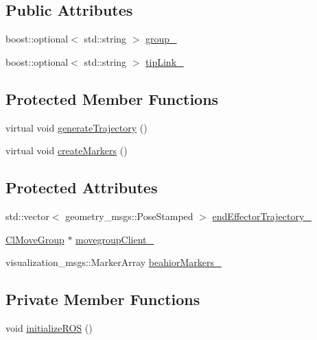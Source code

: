 \subsection*{Public Attributes}
\begin{DoxyCompactItemize}
\item 
boost\+::optional$<$ std\+::string $>$ \hyperlink{classcl__move__group__interface_1_1CbMoveEndEffectorTrajectory_aa247cf74c1d4878bacecba836a839fa7}{group\+\_\+}
\item 
boost\+::optional$<$ std\+::string $>$ \hyperlink{classcl__move__group__interface_1_1CbMoveEndEffectorTrajectory_a24c6c30b9b0761a61fa002d947bd3e11}{tip\+Link\+\_\+}
\end{DoxyCompactItemize}
\subsection*{Protected Member Functions}
\begin{DoxyCompactItemize}
\item 
virtual void \hyperlink{classcl__move__group__interface_1_1CbMoveEndEffectorTrajectory_aeae938ab66e18ab7d2fb2427bc83647b}{generate\+Trajectory} ()
\item 
virtual void \hyperlink{classcl__move__group__interface_1_1CbMoveEndEffectorTrajectory_a442efa1d5bc9e9a16f74ecd31b13d9b5}{create\+Markers} ()
\end{DoxyCompactItemize}
\subsection*{Protected Attributes}
\begin{DoxyCompactItemize}
\item 
std\+::vector$<$ geometry\+\_\+msgs\+::\+Pose\+Stamped $>$ \hyperlink{classcl__move__group__interface_1_1CbMoveEndEffectorTrajectory_ae13dfd31ea3660646e03882f0c2c29f0}{end\+Effector\+Trajectory\+\_\+}
\item 
\hyperlink{classcl__move__group__interface_1_1ClMoveGroup}{Cl\+Move\+Group} $\ast$ \hyperlink{classcl__move__group__interface_1_1CbMoveEndEffectorTrajectory_aea650d3e7836125b32be97392b71a7f3}{movegroup\+Client\+\_\+}
\item 
visualization\+\_\+msgs\+::\+Marker\+Array \hyperlink{classcl__move__group__interface_1_1CbMoveEndEffectorTrajectory_a809fb5385adf27c0a1c8f8136566949c}{beahior\+Markers\+\_\+}
\end{DoxyCompactItemize}
\subsection*{Private Member Functions}
\begin{DoxyCompactItemize}
\item 
void \hyperlink{classcl__move__group__interface_1_1CbMoveEndEffectorTrajectory_afcee8f3853a5cef8806137a304c8a14b}{initialize\+R\+OS} ()
\end{DoxyCompactItemize}
